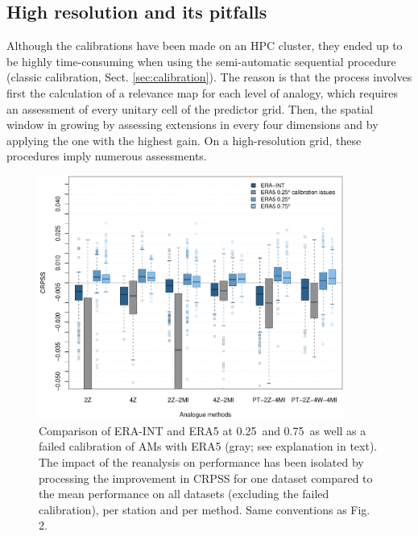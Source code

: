 \documentclass[alpha-refs]{wiley-article}
\begin{document}
\subsection{High resolution and its pitfalls}
\label{sec:results_hires}

Although the calibrations have been made on an HPC cluster, they ended up to be highly time-consuming when using the semi-automatic sequential procedure (classic calibration, Sect. \ref{sec:calibration}). The reason is that the process involves first the calculation of a relevance map for each level of analogy, which requires an assessment of every unitary cell of the predictor grid. Then, the spatial window in growing by assessing extensions in every four dimensions and by applying the one with the highest gain. On a high-resolution grid, these procedures imply numerous assessments.

\begin{figure}[bt]
	\centering
	\includegraphics[width=100mm]{figures/boxplot-resol-diff.pdf}
	\caption{Comparison of ERA-INT and ERA5 at 0.25\degree\ and 0.75\degree\ as well as a failed calibration of AMs with ERA5 (gray; see explanation in text). The impact of the reanalysis on performance has been isolated by processing the improvement in CRPSS for one dataset compared to the mean performance on all datasets (excluding the failed calibration), per station and per method. Same conventions as Fig. 2.}
	\label{fig:resolution}
\end{figure}
\end{document}
